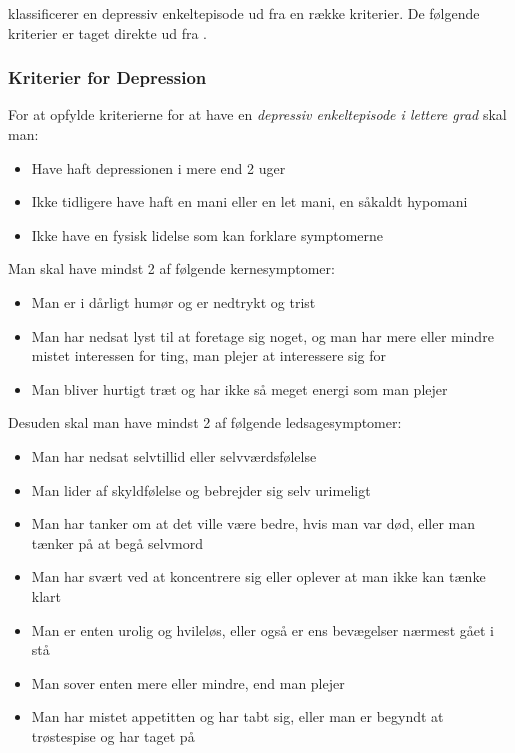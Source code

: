  klassificerer en depressiv enkeltepisode ud fra en række kriterier.
De følgende kriterier er taget direkte ud fra \citet{misc:netpsykdepression}.

\begin{mdframed}
\subsubsection{Kriterier for Depression}
For at opfylde kriterierne for at have en \textit{depressiv enkeltepisode i lettere grad} skal man:
\begin{itemize}
	\item Have haft depressionen i mere end 2 uger
	\item Ikke tidligere have haft en mani eller en let mani, en såkaldt hypomani
	\item Ikke have en fysisk lidelse som kan forklare symptomerne
\end{itemize}
Man skal have mindst 2 af følgende kernesymptomer:
\begin{itemize}
	\item Man er i dårligt humør og er nedtrykt og trist
	\item Man har nedsat lyst til at foretage sig noget, og man har mere eller mindre mistet interessen for ting, man plejer at interessere sig for
	\item Man bliver hurtigt træt og har ikke så meget energi som man plejer
\end{itemize}
Desuden skal man have mindst 2 af følgende ledsagesymptomer:
\begin{itemize}
	\item Man har nedsat selvtillid eller selvværdsfølelse
	\item Man lider af skyldfølelse og bebrejder sig selv urimeligt
	\item Man har tanker om at det ville være bedre, hvis man var død, eller man tænker på at begå selvmord
	\item Man har svært ved at koncentrere sig eller oplever at man ikke kan tænke klart
	\item Man er enten urolig og hvileløs, eller også er ens bevægelser nærmest gået i stå
	\item Man sover enten mere eller mindre, end man plejer
	\item Man har mistet appetitten og har tabt sig, eller man er begyndt at trøstespise og har taget på
\end{itemize}
\end{mdframed}

